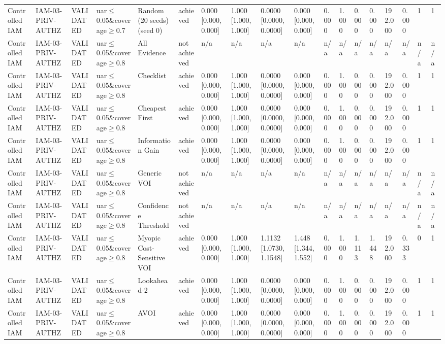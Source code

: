\begin{table}[!ht]
{\begin{tabular}{llllllllllllllllll}
Controlled IAM & IAM-03-PRIV-AUTHZ & VALIDATED & uar$\le$0.05\&coverage$\ge$0.7 & Random (20 seeds) (seed 0) & achieved & 0.000 [0.000, 0.000] & 1.000 [1.000, 1.000] & 0.0000 [0.0000, 0.0000] & 0.000 [0.000, 0.000] & 0.000 & 1.000 & 0.000 & 0.000 & 192.000 & 0.000 & 1 & 1 \\
Controlled IAM & IAM-03-PRIV-AUTHZ & VALIDATED & uar$\le$0.05\&coverage$\ge$0.8 & All Evidence & not achieved & n/a & n/a & n/a & n/a & n/a & n/a & n/a & n/a & n/a & n/a & n/a & n/a \\
Controlled IAM & IAM-03-PRIV-AUTHZ & VALIDATED & uar$\le$0.05\&coverage$\ge$0.8 & Checklist & achieved & 0.000 [0.000, 0.000] & 1.000 [1.000, 1.000] & 0.0000 [0.0000, 0.0000] & 0.000 [0.000, 0.000] & 0.000 & 1.000 & 0.000 & 0.000 & 192.000 & 0.000 & 1 & 1 \\
Controlled IAM & IAM-03-PRIV-AUTHZ & VALIDATED & uar$\le$0.05\&coverage$\ge$0.8 & Cheapest First & achieved & 0.000 [0.000, 0.000] & 1.000 [1.000, 1.000] & 0.0000 [0.0000, 0.0000] & 0.000 [0.000, 0.000] & 0.000 & 1.000 & 0.000 & 0.000 & 192.000 & 0.000 & 1 & 1 \\
Controlled IAM & IAM-03-PRIV-AUTHZ & VALIDATED & uar$\le$0.05\&coverage$\ge$0.8 & Information Gain & achieved & 0.000 [0.000, 0.000] & 1.000 [1.000, 1.000] & 0.0000 [0.0000, 0.0000] & 0.000 [0.000, 0.000] & 0.000 & 1.000 & 0.000 & 0.000 & 192.000 & 0.000 & 1 & 1 \\
Controlled IAM & IAM-03-PRIV-AUTHZ & VALIDATED & uar$\le$0.05\&coverage$\ge$0.8 & Generic VOI & not achieved & n/a & n/a & n/a & n/a & n/a & n/a & n/a & n/a & n/a & n/a & n/a & n/a \\
Controlled IAM & IAM-03-PRIV-AUTHZ & VALIDATED & uar$\le$0.05\&coverage$\ge$0.8 & Confidence Threshold & not achieved & n/a & n/a & n/a & n/a & n/a & n/a & n/a & n/a & n/a & n/a & n/a & n/a \\
Controlled IAM & IAM-03-PRIV-AUTHZ & VALIDATED & uar$\le$0.05\&coverage$\ge$0.8 & Myopic Cost-Sensitive VOI & achieved & 0.000 [0.000, 0.000] & 1.000 [1.000, 1.000] & 1.1132 [1.0730, 1.1548] & 1.448 [1.344, 1.552] & 0.000 & 1.000 & 1.113 & 1.448 & 192.000 & 0.333 & 0 & 1 \\
Controlled IAM & IAM-03-PRIV-AUTHZ & VALIDATED & uar$\le$0.05\&coverage$\ge$0.8 & Lookahead-2 & achieved & 0.000 [0.000, 0.000] & 1.000 [1.000, 1.000] & 0.0000 [0.0000, 0.0000] & 0.000 [0.000, 0.000] & 0.000 & 1.000 & 0.000 & 0.000 & 192.000 & 0.000 & 1 & 1 \\
Controlled IAM & IAM-03-PRIV-AUTHZ & VALIDATED & uar$\le$0.05\&coverage$\ge$0.8 & AVOI & achieved & 0.000 [0.000, 0.000] & 1.000 [1.000, 1.000] & 0.0000 [0.0000, 0.0000] & 0.000 [0.000, 0.000] & 0.000 & 1.000 & 0.000 & 0.000 & 192.000 & 0.000 & 1 & 1 \\

\end{tabular}}
\end{table}
